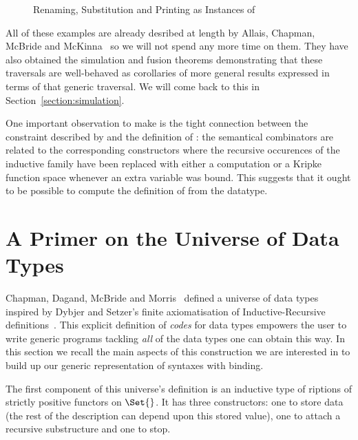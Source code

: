 \begin{figure}[h]
\begin{minipage}{0.40\textwidth}
\end{minipage}\hspace{1em}
\begin{minipage}{0.50\textwidth}
\end{minipage}
\caption{Renaming, Substitution and Printing as Instances of }
\end{figure}

All of these examples are already desribed at length by Allais, Chapman,
McBride and McKinna~\citeyear{allais2017type} so we will not spend any
more time on them. They have also obtained the simulation and fusion
theorems demonstrating that these traversals are well-behaved as
corollaries of more general results expressed in terms of that generic
traversal. We will come back to this in Section~\ref{section:simulation}.

One important observation to make is the tight connection between the
constraint described by  and the definition of : the
semantical combinators are related to the corresponding constructors
where the recursive occurences of the inductive family have been replaced
with either a computation or a Kripke function space whenever an
extra variable was bound. This suggests that it ought to be possible
to compute the definition of  from the datatype.

\section{A Primer on the Universe of Data Types}

Chapman, Dagand, McBride and Morris~\citeyear{Chapman:2010:GAL:1863543.1863547}
defined a universe of data types inspired by Dybjer and Setzer's
finite axiomatisation of Inductive-Recursive definitions~\citeyear{Dybjer1999}.
This explicit definition of \emph{codes} for data types empowers the
user to write generic programs tackling \emph{all} of the data types
one can obtain this way. In this section we recall the main aspects
of this construction we are interested in to build up our generic
representation of syntaxes with binding.

The first component of this universe's definition is an inductive type
of riptions of strictly positive functors on $\Set{}$. It has
three constructors: one to store data (the rest of the description can
depend upon this stored value), one to attach a recursive substructure
and one to stop.

